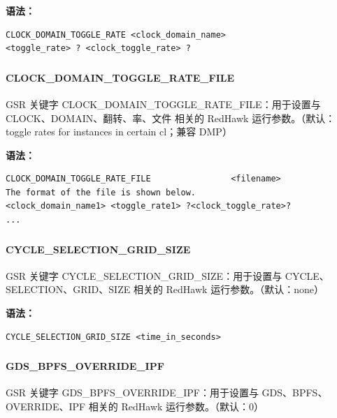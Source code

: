 \textbf{语法：}
\begin{lstlisting}
CLOCK_DOMAIN_TOGGLE_RATE <clock_domain_name>
<toggle_rate> ? <clock_toggle_rate> ?
\end{lstlisting}

\subsubsection{}
\paragraph*{CLOCK_DOMAIN_TOGGLE_RATE_FILE}

GSR 关键字 CLOCK_DOMAIN_TOGGLE_RATE_FILE：用于设置与 CLOCK、DOMAIN、翻转、率、文件 相关的 RedHawk 运行参数。（默认：toggle rates for instances in certain cl；兼容 DMP）

\textbf{语法：}
\begin{lstlisting}
CLOCK_DOMAIN_TOGGLE_RATE_FILE                <filename>
The format of the file is shown below.
<clock_domain_name1> <toggle_rate1> ?<clock_toggle_rate>?
...
\end{lstlisting}

\subsubsection{}
\paragraph*{CYCLE_SELECTION_GRID_SIZE}

GSR 关键字 CYCLE_SELECTION_GRID_SIZE：用于设置与 CYCLE、SELECTION、GRID、SIZE 相关的 RedHawk 运行参数。（默认：none）

\textbf{语法：}
\begin{lstlisting}
CYCLE_SELECTION_GRID_SIZE <time_in_seconds>
\end{lstlisting}

\subsubsection{}
\paragraph*{GDS_BPFS_OVERRIDE_IPF}

GSR 关键字 GDS_BPFS_OVERRIDE_IPF：用于设置与 GDS、BPFS、OVERRIDE、IPF 相关的 RedHawk 运行参数。（默认：0）

